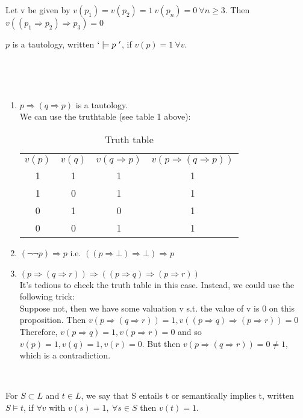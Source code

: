 \begin{example}
Let v be given by $v(p_1)=v(p_2)=1 ~v(p_n)=0 ~\forall n \ge 3$.
Then $v((p_1 \Rightarrow p_2) \Rightarrow p_3)=0$\\
\end{example}
\begin{definition}
$p$ is a tautology, written $`\models p~'$, if $v(p)=1 ~\forall v$.
\end{definition}
~\\
\begin{example}
~\\
\begin{enumerate}
\item $p \Rightarrow (q \Rightarrow p)$ is a tautology.\\
We can use the truthtable (see table 1 above):
\begin{table}
\caption{Truth table}
\centering
\begin{tabular}{c c c c}
$v(p)$ & $v(q)$ & $v(q \Rightarrow p)$ & $v(p \Rightarrow(q \Rightarrow p))$ \\[0.5ex]
1 & 1 & 1 & 1 \\
1 & 0 & 1 & 1 \\
0 & 1 & 0 & 1 \\
0 & 0 & 1 & 1 \\[1ex]
\end{tabular}
\end{table}
\item $(\neg \neg p) \Rightarrow p$ i.e. $((p \Rightarrow \bot)
\Rightarrow \bot) \Rightarrow p$ \\
\item $(p \Rightarrow (q \Rightarrow r)) \Rightarrow ((p \Rightarrow q)
 \Rightarrow (p \Rightarrow r))$ \\
It's tedious to check the truth table in this case. Instead,
we could use the following trick:\\
Suppose not, then we have some valuation v s.t. the value of
v is 0 on this proposition.
Then $ v(p \Rightarrow (q \Rightarrow r))=1, v((p \Rightarrow q)
\Rightarrow (p \Rightarrow r))=0$ \\
Therefore, $v(p \Rightarrow q)=1, v(p \Rightarrow r)=0$ and so
$v(p)=1, v(q)=1, v(r)=0$. But then $v(p \Rightarrow (q \Rightarrow r))=0
\neq 1$, which is a contradiction.
\end{enumerate}
\end{example}
~\\
\begin{definition}
For $S \subset L$ and $t \in L$, we say that S entails t or semantically
implies t, written $S \models t$, if $\forall v$ with $v(s)=1,~\forall
s \in S$ then $v(t)=1$.
\end{definition}
